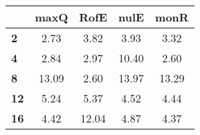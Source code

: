 \begin{tabular}{|l|c|c|c|c|}
\hline
&\textbf{maxQ}&\textbf{RofE}&\textbf{nulE}&\textbf{monR}\\\hline
\textbf{2}&2.73&3.82&3.93&3.32\\\hline
\textbf{4}&2.84&2.97&10.40&2.60\\\hline
\textbf{8}&13.09&2.60&13.97&13.29\\\hline
\textbf{12}&5.24&5.37&4.52&4.44\\\hline
\textbf{16}&4.42&12.04&4.87&4.37\\\hline
\end{tabular}
